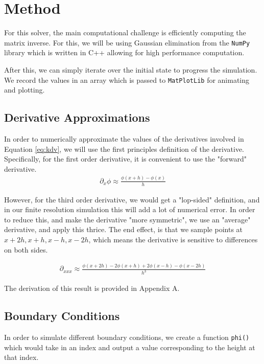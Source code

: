 \section{Method}\label{sec:method}

For this solver, the main computational challenge is efficiently computing the matrix inverse. For this, we will be using Gaussian elimination from the \texttt{NumPy} library which is written in C++ allowing for high performance computation.

After this, we can simply iterate over the initial state to progress the simulation. We record the values in an array which is passed to \texttt{MatPlotLib} for animating and plotting.

\subsection{Derivative Approximations}

In order to numerically approximate the values of the derivatives involved in Equation \ref{eq:kdv}, we will use the first principles definition of the derivative.
Specifically, for the first order derivative, it is convenient to use the "forward" derivative.
\begin{align}
  \partial_{x} \phi \approx \frac{\phi(x+h)-\phi(x)}{h}
\end{align}

However, for the third order derivative, we would get a "lop-sided" definition, and in our finite resolution simulation this will add a lot of numerical error. In order to reduce this, and make the derivative "more symmetric", we use an "average" derivative, and apply this thrice. The end effect, is that we sample points at $x+2h, x+h, x-h, x-2h$, which means the derivative is sensitive to differences on both sides.

\begin{align}
  \partial_{xxx} \approx \frac{\phi(x+2h) - 2 \phi(x+h) + 2 \phi(x-h) - \phi(x-2h)}{h^3}
\end{align}

The derivation of this result is provided in Appendix A.

\subsection{Boundary Conditions}

In order to simulate different boundary conditions, we create a function \texttt{phi()} which would take in an index and output a value corresponding to the height at that index.
\vs

